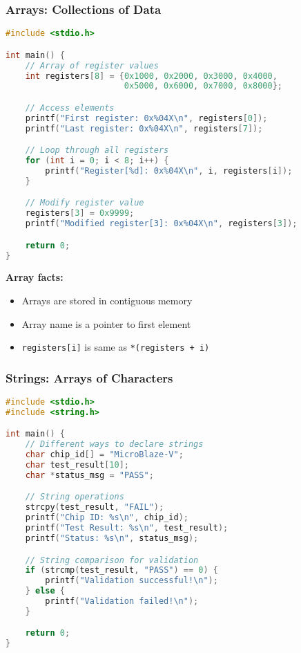 \documentclass{beamer}
\begin{document}
\begin{frame}[fragile]
\frametitle{Arrays: Collections of Data}
\begin{lstlisting}[language=C]
#include <stdio.h>

int main() {
    // Array of register values
    int registers[8] = {0x1000, 0x2000, 0x3000, 0x4000,
                        0x5000, 0x6000, 0x7000, 0x8000};

    // Access elements
    printf("First register: 0x%04X\n", registers[0]);
    printf("Last register: 0x%04X\n", registers[7]);

    // Loop through all registers
    for (int i = 0; i < 8; i++) {
        printf("Register[%d]: 0x%04X\n", i, registers[i]);
    }

    // Modify register value
    registers[3] = 0x9999;
    printf("Modified register[3]: 0x%04X\n", registers[3]);

    return 0;
}
\end{lstlisting}

\textbf{Array facts:}
\begin{itemize}
    \item Arrays are stored in contiguous memory
    \item Array name is a pointer to first element
    \item \texttt{registers[i]} is same as \texttt{*(registers + i)}
\end{itemize}
\end{frame}

\begin{frame}[fragile]
\frametitle{Strings: Arrays of Characters}
\begin{lstlisting}[language=C]
#include <stdio.h>
#include <string.h>

int main() {
    // Different ways to declare strings
    char chip_id[] = "MicroBlaze-V";
    char test_result[10];
    char *status_msg = "PASS";

    // String operations
    strcpy(test_result, "FAIL");
    printf("Chip ID: %s\n", chip_id);
    printf("Test Result: %s\n", test_result);
    printf("Status: %s\n", status_msg);

    // String comparison for validation
    if (strcmp(test_result, "PASS") == 0) {
        printf("Validation successful!\n");
    } else {
        printf("Validation failed!\n");
    }

    return 0;
}
\end{lstlisting}
\end{frame}
\end{document}
